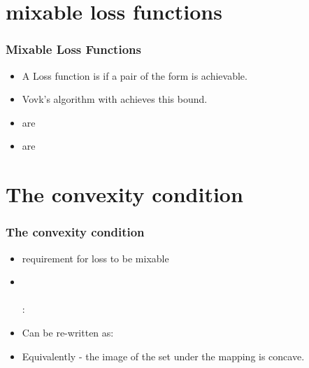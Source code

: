 \documentclass[handout]{beamer}
\begin{document}
\section{mixable loss functions}
\begin{frame}
\frametitle{Mixable Loss Functions}
\begin{itemize}
\item A Loss function is  if a pair of the form  is achievable.
\item Vovk's algorithm with  achieves this bound.
\item {} are 
\item {} are 
\end{itemize}
\end{frame}


\section{The convexity condition}

\begin{frame}
\frametitle{The convexity condition}
\begin{itemize}
\item requirement for loss to be  mixable
\item 
{} \\
\R{$\exists \B{\gamma} \in \Gamma$} \\
\R{$\forall \omega \in \Omega$}:
\item
Can be re-written as:
\item
Equivalently - the image of the set \R{$\Gamma$} under the
mapping
 is concave.
\end{itemize}
\end{frame}
\end{document}
